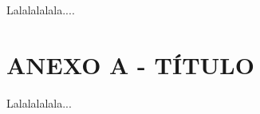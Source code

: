 \documentclass[
	12pt,				%
	oneside,			%
	a4paper,			%
	english,			%
	french,				%
	spanish,			%
	brazil,				%
	]{abntex2}
\theoremstyle{plain}
\theoremstyle{definition}
\begin{document}
Lalalalalala....









\chapter*[Anexos]{ANEXO A - TÍTULO}

Lalalalalala...






\printindex
\end{document}

